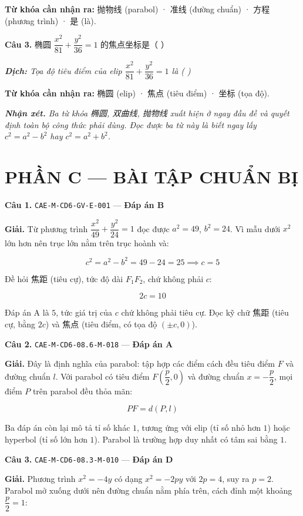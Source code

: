 \documentclass[11pt, a4paper]{article}
\begin{document}
\textbf{Từ khóa cần nhận ra:} 抛物线 (parabol) · 准线 (đường chuẩn) · 方程 (phương trình) · 是 (là).

\textbf{Câu 3.} 椭圆 $\dfrac{x^2}{81} + \dfrac{y^2}{36} = 1$ 的焦点坐标是（ ）

\noindent\emph{\textbf{Dịch:} Tọa độ tiêu điểm của elip $\dfrac{x^2}{81} + \dfrac{y^2}{36} = 1$ là ( )}

\textbf{Từ khóa cần nhận ra:} 椭圆 (elip) · 焦点 (tiêu điểm) · 坐标 (tọa độ).

\noindent\emph{\textbf{Nhận xét.} Ba từ khóa 椭圆, 双曲线, 抛物线 xuất hiện ở ngay đầu đề và quyết định toàn bộ công thức phải dùng. Đọc được ba từ này là biết ngay lấy $c^2 = a^2 - b^2$ hay $c^2 = a^2 + b^2$.}

\section{PHẦN C — BÀI TẬP CHUẨN BỊ}

\textbf{Câu 1.} \texttt{CAE-M-CD6-GV-E-001} — \textbf{Đáp án B}

\textbf{Giải.} Từ phương trình $\dfrac{x^2}{49} + \dfrac{y^2}{24} = 1$ đọc được $a^2 = 49$, $b^2 = 24$. Vì mẫu dưới $x^2$ lớn hơn nên trục lớn nằm trên trục hoành và:

$$c^2 = a^2 - b^2 = 49 - 24 = 25 \implies c = 5$$

Đề hỏi 焦距 (tiêu cự), tức độ dài $F_1F_2$, chứ không phải $c$:

$$2c = 10$$

 Đáp án A là $5$, tức giá trị của $c$ chứ không phải tiêu cự. Đọc kỹ chữ 焦距 (tiêu cự, bằng $2c$) và 焦点 (tiêu điểm, có tọa độ $(\pm c, 0)$).

\textbf{Câu 2.} \texttt{CAE-M-CD6-08.6-M-018} — \textbf{Đáp án A}

\textbf{Giải.} Đây là định nghĩa của parabol: tập hợp các điểm cách đều tiêu điểm $F$ và đường chuẩn $l$. Với parabol có tiêu điểm $F\left(\dfrac{p}{2}, 0\right)$ và đường chuẩn $x = -\dfrac{p}{2}$, mọi điểm $P$ trên parabol đều thỏa mãn:

$$PF = d(P, l)$$

 Ba đáp án còn lại mô tả tỉ số khác $1$, tương ứng với elip (tỉ số nhỏ hơn $1$) hoặc hyperbol (tỉ số lớn hơn $1$). Parabol là trường hợp duy nhất có tâm sai bằng $1$.

\textbf{Câu 3.} \texttt{CAE-M-CD6-08.3-M-010} — \textbf{Đáp án D}

\textbf{Giải.} Phương trình $x^2 = -4y$ có dạng $x^2 = -2py$ với $2p = 4$, suy ra $p = 2$. Parabol mở xuống dưới nên đường chuẩn nằm phía trên, cách đỉnh một khoảng $\dfrac{p}{2} = 1$:
\end{document}
